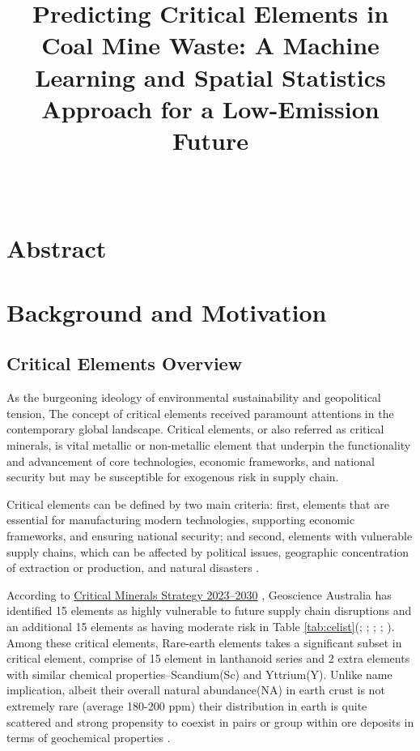 \documentclass[11pt,a4paper,]{article}
\title{Predicting Critical Elements in Coal Mine Waste: A Machine Learning and Spatial Statistics Approach for a Low-Emission Future}
\author{\sf{\Large\textbf{Yuhao Long}\\\large Master of Business Analytics\newline 33412448 \newline \href{mailto:ylon0012@student.monash.edu}{\nolinkurl{ylon0012@student.monash.edu}}\\[0.5cm]}{\Large\textbf{Evan Ginting}\\\large Master of Business Analytics\newline 33477558 \newline \href{mailto:egin0003@student.monash.edu}{\nolinkurl{egin0003@student.monash.edu}}\\[0.5cm]}}
\date{\sf\Date~\Month~\Year}
\makeatletter
\def\titlepage{\front{\expandafter{\@title}}{\@author}{\@organization}}
\makeatother
\begin{document}
\titlepage

{
\setcounter{tocdepth}{2}
\tableofcontents
}
\newpage

\hypertarget{abstract}{%
\section{Abstract}\label{abstract}}

\hypertarget{background-and-motivation}{%
\section{Background and Motivation}\label{background-and-motivation}}

\hypertarget{critical-elements-overview}{%
\subsection{Critical Elements Overview}\label{critical-elements-overview}}

As the burgeoning ideology of environmental sustainability and geopolitical tension, The concept of critical elements received paramount attentions in the contemporary global landscape. Critical elements, or also referred as critical minerals, is vital metallic or non-metallic element that underpin the functionality and advancement of core technologies, economic frameworks, and national security but may be susceptible for exogenous risk in supply chain.

Critical elements can be defined by two main criteria: first, elements that are essential for manufacturing modern technologies, supporting economic frameworks, and ensuring national security; and second, elements with vulnerable supply chains, which can be affected by political issues, geographic concentration of extraction or production, and natural disasters \autocite{Lian2024,Fortier2018,DISR2023}.

According to \href{https://www.industry.gov.au/publications/critical-minerals-strategy-2023-2030}{Critical Minerals Strategy 2023--2030} \autocite{geoscience2023}, Geoscience Australia has identified 15 elements as highly vulnerable to future supply chain disruptions and an additional 15 elements as having moderate risk in Table \ref{tab:celist}(\autocite{Coyne2023}; \autocite{Skirrow2013}; \autocite{IEA2024b}; \autocite{Fortier2018}; \autocite{Austrade2024}). Among these critical elements, Rare-earth elements takes a significant subset in critical element, comprise of 15 element in lanthanoid series and 2 extra elements with similar chemical properties--Scandium(Sc) and Yttrium(Y). Unlike name implication, albeit their overall natural abundance(NA) in earth crust is not extremely rare (average 180-200 ppm) their distribution in earth is quite scattered and strong propensity to coexist in pairs or group within ore deposits in terms of geochemical properties \autocite{Zhou2017}.
\end{document}
